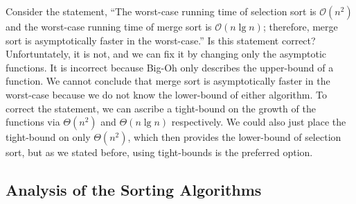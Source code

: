 \example Consider the statement, ``The worst-case running time of selection sort is $\mathcal{O}(n^2)$ and the worst-case running time of merge sort is $\mathcal{O}(n\lg{n})$; therefore, merge sort is asymptotically faster in the worst-case.'' Is this statement correct? Unfortuntately, it is not, and we can fix it by changing only the asymptotic functions. It is incorrect because Big-Oh only describes the upper-bound of a function. We cannot conclude that merge sort is asymptotically faster in the worst-case because we do not know the lower-bound of either algorithm. To correct the statement, we can ascribe a tight-bound on the growth of the functions via $\Theta(n^2)$ and $\Theta(n\lg{n})$ respectively. We could also just place the tight-bound on only $\Theta(n^2)$, which then provides the lower-bound of selection sort, but as we stated before, using tight-bounds is the preferred option.

\subsection*{Analysis of the Sorting Algorithms}